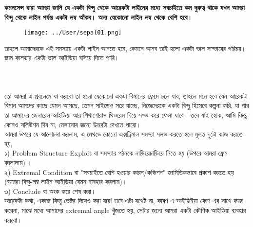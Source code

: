 \documentclass[12pt,a4paper]{article}
\begin{document}
\textbf{কমনসেন্স দ্বারা আমরা জানি যে একটা বিন্দু থেকে আরেকটা লাইনের মধ্যে সবচাইতে কম দুরুত্ব থাকে যখন আমরা বিন্দু থেকে লাইন পর্যন্ত একটা লম্ব আঁকব। অন্য যেকোনো লাইন লম্ব থেকে বেশি হবে। }
 \begin{figure}[hbtp]
 \centering
 \texttt{[image: ../User/sepal01.png]}
 \end{figure}
তাহলে আমাদেরকে এই সমস্যায় একটা লাইন আনতে হবে, কেমনে আনব তাই হলো একটা ভাল সল্ভারের পরিচয়। জান কালডার একটা ভাল আইডিয়া বসিয়ে দিতে পারি। \\
\\
\\
\\
তো আমরা এ প্রবলেমে যা করবো তা হলো যেকোনো একটা বিমানের ফ্রেমে চলে যাব, তাহলে মনে হবে যেন আরেকটা বিমান আমদের কাছে যেমন আসছে, তেমন সাইডেও সরে যাচ্ছে, নিজেদেরকে একটা বিন্দু হিসেবে কল্পনা করি, যা পাব তা আমাদের জেনারেল আইডিয়া আর পিথাগোরাস থিওরেম দিয়ে সল্ভ করে ফেলা যাবে। তবে যাই হোক, আমি কিন্তু  কোনও সলিউশন দিব না, মেলানোর জন্যে উত্তরটা দেখতে পারো।  \\
আমরা উপরে যে আলোচনা করলাম, এ মেথডে কোনো এক্সট্রিমাল সমস্যা সলভ করতে হলে মূলত দুটো কাজ করতে হয়, \\
১) Problem Structure Exploit বা সমস্যার গঠনকে নাড়িয়েচাড়িয়ে নিতে হয় (উপরে আমরা ফ্রেম বদলালাম) । \\
২) Extremal Condition বা "সবচাইতে বেশি হওয়ার কারন/কন্ডিশন" জ্যমিতিকভাবে প্রকাশ করতে হয় (আমরা বিন্দু-লম্ব লাইন আইডিয়া যেমন ব্যবহার করলাম)।\\
৩) Conclude বা অংক করে শেষ করা। \\
আরেকটা কথা, একাজ কিন্তু ভেক্টর দিয়েও করা যায়!
%
তবে এটা যথেষ্ট না, কারণ এ আইডিইয়া কোণ এর সাথে কাজ করেনা, মাঝে মধ্যে আমাদের extremal angle খুঁজতে হয়, সেটার জন্যে আমরা একটা কৌণিক আইডিয়া ব্যবহার করবো।\\ 
\end{document}
